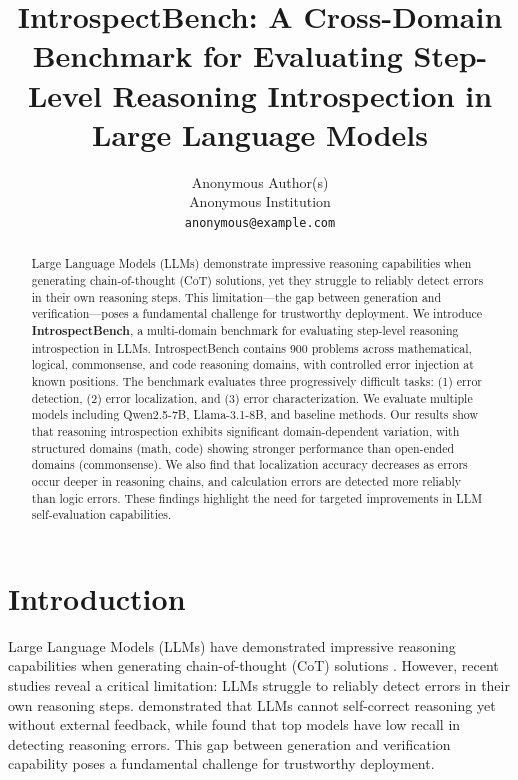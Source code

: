 \documentclass{article}
\title{IntrospectBench: A Cross-Domain Benchmark for Evaluating Step-Level Reasoning Introspection in Large Language Models}
\author{
  Anonymous Author(s) \\
  Anonymous Institution \\
  \texttt{anonymous@example.com}
}
\date{}
\begin{document}
\maketitle

\begin{abstract}
Large Language Models (LLMs) demonstrate impressive reasoning capabilities when generating chain-of-thought (CoT) solutions, yet they struggle to reliably detect errors in their own reasoning steps. This limitation---the gap between generation and verification---poses a fundamental challenge for trustworthy deployment. We introduce \textbf{IntrospectBench}, a multi-domain benchmark for evaluating step-level reasoning introspection in LLMs. IntrospectBench contains 900 problems across mathematical, logical, commonsense, and code reasoning domains, with controlled error injection at known positions. The benchmark evaluates three progressively difficult tasks: (1) error detection, (2) error localization, and (3) error characterization. We evaluate multiple models including Qwen2.5-7B, Llama-3.1-8B, and baseline methods. Our results show that reasoning introspection exhibits significant domain-dependent variation, with structured domains (math, code) showing stronger performance than open-ended domains (commonsense). We also find that localization accuracy decreases as errors occur deeper in reasoning chains, and calculation errors are detected more reliably than logic errors. These findings highlight the need for targeted improvements in LLM self-evaluation capabilities.
\end{abstract}

\section{Introduction}

Large Language Models (LLMs) have demonstrated impressive reasoning capabilities when generating chain-of-thought (CoT) solutions \citep{wei2022chain}. However, recent studies reveal a critical limitation: LLMs struggle to reliably detect errors in their own reasoning steps. \citet{huang2024llmscannotselfcorrect} demonstrated that LLMs cannot self-correct reasoning yet without external feedback, while \citet{kamoi2024when} found that top models have low recall in detecting reasoning errors. This gap between generation and verification capability poses a fundamental challenge for trustworthy deployment.
\end{document}
